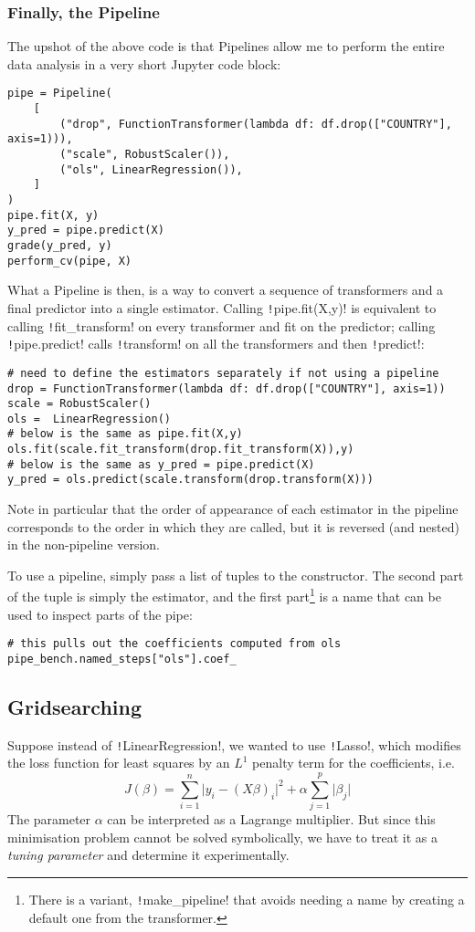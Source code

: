 \documentclass[11pt]{article}
\theoremstyle{definition}
\begin{document}
\subsubsection{Finally, the Pipeline}
The upshot of the above code is that Pipelines allow me to perform the entire data analysis in a very short Jupyter code block:
\begin{verbatim}
pipe = Pipeline(
    [
        ("drop", FunctionTransformer(lambda df: df.drop(["COUNTRY"], axis=1))),
        ("scale", RobustScaler()),
        ("ols", LinearRegression()),
    ]
)
pipe.fit(X, y)
y_pred = pipe.predict(X)
grade(y_pred, y)
perform_cv(pipe, X)
\end{verbatim}
What a Pipeline is then, is a way to convert a sequence of transformers and a final predictor into a single estimator. 
Calling \texttt!pipe.fit(X,y)! is equivalent to calling \texttt!fit_transform! on every transformer and fit on the predictor; calling \texttt!pipe.predict! calls \texttt!transform! on all the transformers and then \texttt!predict!:
\begin{verbatim}
# need to define the estimators separately if not using a pipeline
drop = FunctionTransformer(lambda df: df.drop(["COUNTRY"], axis=1))
scale = RobustScaler()
ols =  LinearRegression()
# below is the same as pipe.fit(X,y)
ols.fit(scale.fit_transform(drop.fit_transform(X)),y) 
# below is the same as y_pred = pipe.predict(X)
y_pred = ols.predict(scale.transform(drop.transform(X))) 
\end{verbatim}
Note in particular that the order of appearance of each estimator in the pipeline corresponds to the order in which they are called, but it is reversed (and nested) in the non-pipeline version.

To use a pipeline, simply pass a list of tuples to the constructor. The second part of the tuple is simply the estimator, and the first part\footnote{There is a variant, \texttt!make_pipeline! that avoids needing a name by creating a default one from the transformer.
} is a name that can be used to inspect parts of the pipe:
\begin{verbatim}
# this pulls out the coefficients computed from ols
pipe_bench.named_steps["ols"].coef_
\end{verbatim}
\subsection{Gridsearching}
Suppose instead of \texttt!LinearRegression!, we wanted to use \texttt!Lasso!, which modifies the loss function for least squares by an \(L^1\) penalty term for the coefficients, i.e.
\[ J(\beta) = \sum_{i=1}^n\lvert y_i-(X\beta)_i\rvert^2 + \alpha \sum_{j=1}^p\lvert\beta_j\rvert\]
The parameter \(\alpha\) can be interpreted as a Lagrange multiplier. But since this minimisation problem cannot be solved symbolically, we have to treat it as a \emph{tuning parameter} and determine it experimentally.
\end{document}
